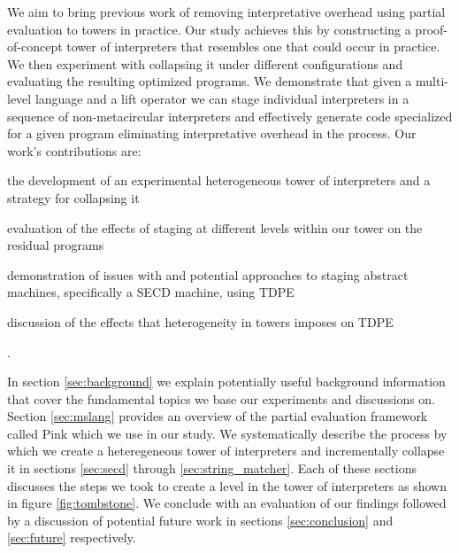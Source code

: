 \documentclass[a4paper,12pt,twoside,openright]{report}
\theoremstyle{definition}
\begin{document}
We aim to bring previous work of removing interpretative overhead using partial evaluation to towers in practice. Our study achieves this by constructing a proof-of-concept tower of interpreters that resembles one that could occur in practice. We then experiment with collapsing it under different configurations and evaluating the resulting optimized programs. We demonstrate that given a multi-level language and a lift operator we can stage individual interpreters in a sequence of non-metacircular interpreters and effectively generate code specialized for a given program eliminating interpretative overhead in the process. Our work's contributions are:
\begin{enumerate*}[label=(\arabic*)]
	\item the development of an experimental heterogeneous tower of interpreters and a strategy for collapsing it
	\item evaluation of the effects of staging at different levels within our tower on the residual programs
	\item demonstration of issues with and potential approaches to staging abstract machines, specifically a SECD machine, using TDPE
	\item discussion of the effects that heterogeneity in towers imposes on TDPE
\end{enumerate*}.

In section \ref{sec:background} we explain potentially useful background information that cover the fundamental topics we base our experiments and discussions on. Section \ref{sec:mslang} provides an overview of the partial evaluation framework called Pink \cite{amin2017collapsing} which we use in our study. We systematically describe the process by which we create a heteregeneous tower of interpreters and incrementally collapse it in sections \ref{sec:secd} through \ref{sec:string_matcher}. Each of these sections discusses the steps we took to create a level in the tower of interpreters as shown in figure \ref{fig:tombstone}. We conclude with an evaluation of our findings followed by a discussion of potential future work in sections \ref{sec:conclusion} and \ref{sec:future} respectively.

\end{document}

